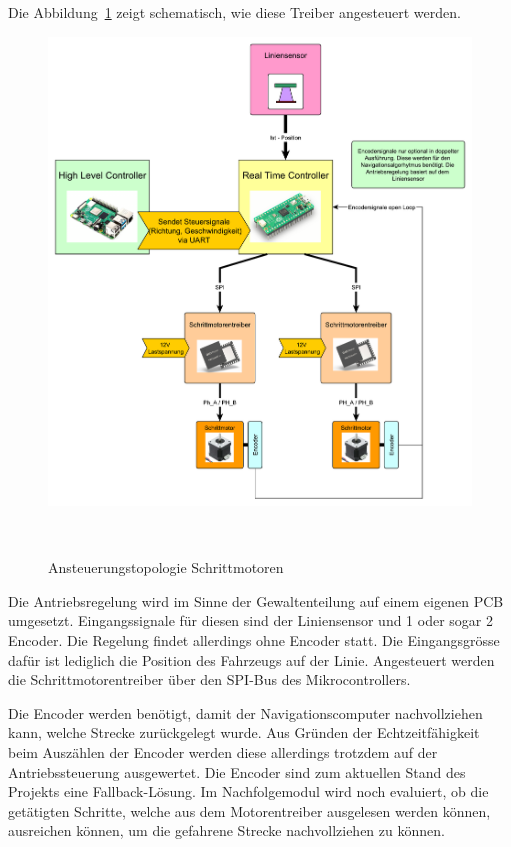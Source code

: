 \documentclass[main.tex]{subfiles} %
\begin{document}
Die Abbildung~\ref{Ansteuerungstopologie_Schrittmotorentreiber} zeigt
schematisch, wie diese Treiber angesteuert werden.

\begin{figure}[H]
    \centering
    \includegraphics[width = 1\linewidth]{fig_Antriebe_und_Dimensionierung/Konzept_RTC_Trinamic.pdf}
    \caption{Ansteuerungstopologie Schrittmotoren}~\label{Ansteuerungstopologie_Schrittmotorentreiber}
\end{figure}

Die Antriebsregelung wird im Sinne der Gewaltenteilung auf einem eigenen PCB
umgesetzt. Eingangssignale für diesen sind der Liniensensor und 1 oder sogar 2
Encoder. Die Regelung findet allerdings ohne Encoder statt. Die Eingangsgrösse
dafür ist lediglich die Position des Fahrzeugs auf der Linie. Angesteuert
werden die Schrittmotorentreiber über den SPI-Bus des Mikrocontrollers.

Die Encoder werden benötigt, damit der Navigationscomputer nachvollziehen kann,
welche Strecke zurückgelegt wurde. Aus Gründen der Echtzeitfähigkeit beim
Auszählen der Encoder werden diese allerdings trotzdem auf der
Antriebssteuerung ausgewertet. Die Encoder sind zum aktuellen Stand des
Projekts eine Fallback-Lösung. Im Nachfolgemodul wird noch evaluiert, ob die
getätigten Schritte, welche aus dem Motorentreiber ausgelesen werden können,
ausreichen können, um die gefahrene Strecke nachvollziehen zu können.
\end{document}
